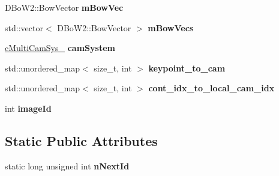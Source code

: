 \begin{DoxyCompactItemize}
\item 
D\+Bo\+W2\+::\+Bow\+Vector {\bfseries m\+Bow\+Vec}\hypertarget{classMultiColSLAM_1_1cMultiKeyFrame_ae322275b18a373a3574bc0b60a6cec55}{}\label{classMultiColSLAM_1_1cMultiKeyFrame_ae322275b18a373a3574bc0b60a6cec55}

\item 
std\+::vector$<$ D\+Bo\+W2\+::\+Bow\+Vector $>$ {\bfseries m\+Bow\+Vecs}\hypertarget{classMultiColSLAM_1_1cMultiKeyFrame_a6d3b9ea74c0c728cc39a00746f58abfe}{}\label{classMultiColSLAM_1_1cMultiKeyFrame_a6d3b9ea74c0c728cc39a00746f58abfe}

\item 
\hyperlink{classMultiColSLAM_1_1cMultiCamSys__}{c\+Multi\+Cam\+Sys\+\_\+} {\bfseries cam\+System}\hypertarget{classMultiColSLAM_1_1cMultiKeyFrame_a131524c0e6cc751f0c4b07e02d1b9eb4}{}\label{classMultiColSLAM_1_1cMultiKeyFrame_a131524c0e6cc751f0c4b07e02d1b9eb4}

\item 
std\+::unordered\+\_\+map$<$ size\+\_\+t, int $>$ {\bfseries keypoint\+\_\+to\+\_\+cam}\hypertarget{classMultiColSLAM_1_1cMultiKeyFrame_afd89847345b824aee88b90e2535a2e77}{}\label{classMultiColSLAM_1_1cMultiKeyFrame_afd89847345b824aee88b90e2535a2e77}

\item 
std\+::unordered\+\_\+map$<$ size\+\_\+t, int $>$ {\bfseries cont\+\_\+idx\+\_\+to\+\_\+local\+\_\+cam\+\_\+idx}\hypertarget{classMultiColSLAM_1_1cMultiKeyFrame_a5bce4f86411c4f6a5438783b5b4be66c}{}\label{classMultiColSLAM_1_1cMultiKeyFrame_a5bce4f86411c4f6a5438783b5b4be66c}

\item 
int {\bfseries image\+Id}\hypertarget{classMultiColSLAM_1_1cMultiKeyFrame_ad48abead49cbc8b6e6d3cc7beb4edd1f}{}\label{classMultiColSLAM_1_1cMultiKeyFrame_ad48abead49cbc8b6e6d3cc7beb4edd1f}

\end{DoxyCompactItemize}
\subsection*{Static Public Attributes}
\begin{DoxyCompactItemize}
\item 
static long unsigned int {\bfseries n\+Next\+Id}\hypertarget{classMultiColSLAM_1_1cMultiKeyFrame_ae4be2cb9a707857eca57741c22c44124}{}\label{classMultiColSLAM_1_1cMultiKeyFrame_ae4be2cb9a707857eca57741c22c44124}

\end{DoxyCompactItemize}
